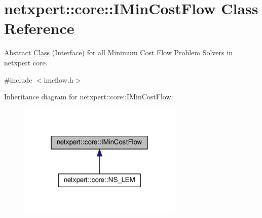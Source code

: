 \hypertarget{classnetxpert_1_1core_1_1IMinCostFlow}{}\section{netxpert\+:\+:core\+:\+:I\+Min\+Cost\+Flow Class Reference}
\label{classnetxpert_1_1core_1_1IMinCostFlow}


Abstract \hyperlink{classClass}{Class} (Interface) for all Minimum Cost Flow Problem Solvers in netxpert core.  




{\ttfamily \#include $<$imcflow.\+h$>$}



Inheritance diagram for netxpert\+:\+:core\+:\+:I\+Min\+Cost\+Flow\+:\nopagebreak
\begin{figure}[H]
\begin{center}
\leavevmode
\includegraphics[width=223pt]{classnetxpert_1_1core_1_1IMinCostFlow__inherit__graph}
\end{center}
\end{figure}
